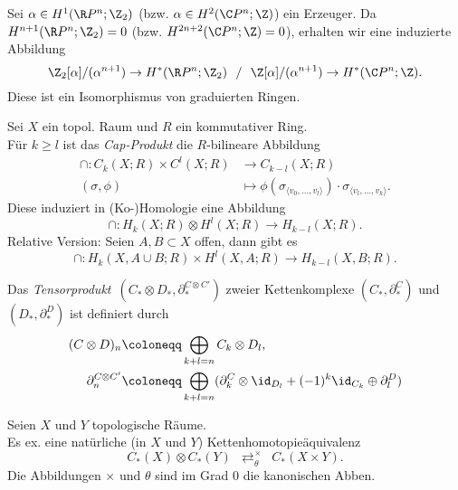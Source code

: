 \documentclass{cheat-sheet}
\newcommand{\angles}[1]{{\langle #1 \rangle}}
\newcommand{\ZM}[1]{\Z_{#1}} %
\begin{document}
\begin{satz}
  Sei $\alpha \in H^1(\R P^n; \ZM{2})$ (bzw. $\alpha \in H^2(\C P^n; \Z)$) ein Erzeuger. Da $H^{n+1}(\R P^n; \ZM{2}) = 0$ (bzw. $H^{2n+2}(\C P^n; \Z) = 0$), erhalten wir eine induzierte Abbildung
  \[
    \ZM{2}[\alpha]/(\alpha^{n+1}) \to H^*(\R P^n; \ZM{2})
    \enspace \,/\, \enspace
    \Z[\alpha]/(\alpha^{n+1}) \to H^*(\C P^n; \Z).
  \]
  Diese ist ein Isomorphismus von graduierten Ringen.
\end{satz}

\begin{defn}
  Sei $X$ ein topol. Raum und $R$ ein kommutativer Ring. \\
  Für $k \geq l$ ist das \emph{Cap-Produkt} die $R$-bilineare Abbildung
  \begin{align*}
    \cap : C_k(X; R) \times C^l(X; R) & \to C_{k-l}(X; R) \\
    (\sigma, \phi) & \mapsto \phi(\sigma_\angles{v_0, \ldots, v_l}) \cdot \sigma_\angles{v_l, \ldots, v_k}.
  \end{align*}
  Diese induziert in (Ko-)Homologie eine Abbildung
  \[ \cap : H_k(X; R) \otimes H^l(X; R) \to H_{k-l}(X; R). \]
  Relative Version: Seien $A, B \subset X$ offen, dann gibt es
  \[ \cap : H_k(X, A \cup B; R) \times H^l(X, A; R) \to H_{k-l}(X, B; R). \]
\end{defn}

\begin{defn}
  Das \emph{Tensorprodukt}~$(C_* \otimes D_*, \partial^{C \otimes C'}_*)$ zweier Kettenkomplexe $(C_*, \partial^C_*)$ und $(D_*, \partial^D_*)$ ist definiert durch
  \begin{align*}
    (C \otimes D)_n & \coloneqq \bigoplus_{k+l=n} C_k \otimes D_l, \\
    \partial^{C \otimes C'}_n & \coloneqq \bigoplus_{k+l=n} (\partial^C_k \otimes \id_{D_l} + (-1)^k \id_{C_k} \oplus \partial^D_l)
  \end{align*}
\end{defn}

\begin{satz}
  Seien $X$ und $Y$ topologische Räume. \\
  Es ex. eine natürliche (in $X$ und $Y$) Kettenhomotopieäquivalenz
  \[ C_*(X) \otimes C_*(Y) \enspace \mathop{\rightleftarrows}^\times_\theta \enspace C_*(X \times Y). \]
  Die Abbildungen $\times$ und $\theta$ sind im Grad $0$ die kanonischen Abben.
\end{satz}
\end{document}
